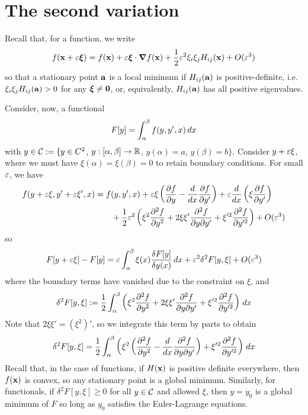 \documentclass{../template/note}
\begin{document}
    \section{The second variation}

    Recall that, for a function, we write
    \begin{align*}
        f(\V x + \eps \V \xi) = f(\V x) + \eps \V \xi \cdot \grad f(\V x) + \frac 1 2 \eps^2 \xi_i \xi_j H_{ij}(\V x) + O(\eps^3)
    \end{align*}
    so that a stationary point $\V a$ is a local minimum if $H_{ij}(\V a)$ is positive-definite, i.e. $\xi_i \xi_j H_{ij}(\V a) > 0$ for any $\V \xi \neq \V 0$, or, equivalently, $H_{ij}(\V a)$ has all positive eigenvalues.

    Consider, now, a functional
    \begin{align*}
        F[y] = \int_{\alpha}^{\beta} f(y, y', x) \,d{x}
    \end{align*}
    with $y \in \mathcal{C} := \{y \in C^2$, $y: [\alpha, \beta] \to \mathbb R$, $y(\alpha) = a$, $y(\beta) = b\}$. Consider $y + \varepsilon \xi$, where we must have $\xi(\alpha) = \xi(\beta) = 0$ to retain boundary conditions. For small $\varepsilon$, we have
    \begin{align*}
        f(y + \eps \xi, y' + \eps \xi', x) &= f(y, y', x) + \eps \xi\left(\pd{f}{y} - \frac{d}{dx} \pd{f}{y'}\right) + \eps \frac{d}{dx}\left(\xi \pd{f}{y'}\right) \\
        &\qquad + \frac 1 2 \eps^2 \left(\xi^2 \pd{^2f}{y^2} + 2\xi \xi' \pd{^2f}{y\pr y'} + \xi'^2 \pd{^2f}{y'^2}\right) + O(\eps^3)
    \end{align*}
    so
    \begin{align*}
        F[y+\varepsilon \xi] - F[y] = \varepsilon \int_\alpha^\beta \xi(x) \frac{\delta F[y]}{\delta y(x)} \,d{x} + \varepsilon^2 \delta^2F[y, \xi] + O(\varepsilon^3)
    \end{align*}
    where the boundary terms have vanished due to the constraint on $\xi$, and
    \begin{align*}
        \delta^2 F[y, \xi] := \frac 1 2 \int_\alpha^\beta \left(\xi^2 \pd{^2f}{y^2} + 2\xi \xi' \pd{^2f}{y\pr y'} + \xi'^2 \pd{^2f}{y'^2}\right) \D x
    \end{align*}
    Note that $2 \xi \xi' = (\xi^2)'$, so we integrate this term by parts to obtain
    \begin{align*}
        \delta^2 F[y, \xi] = \frac 1 2 \int_\alpha^\beta \left(\xi^2 \left(\pd{^2f}{y^2} - \frac{d}{dx} \pd{^2f}{y \pr y'}\right) + \xi'^2 \pd{^2f}{y'^2}\right) \D x
    \end{align*}
    Recall that, in the case of functions, if $H(\V x)$ is positive definite everywhere, then $f(\V x)$ is convex, so any stationary point is a global minimum. Similarly, for functionals, if $\delta^2 F[y, \xi] \geq 0$ for all $y \in \mathcal{C}$ and allowed $\xi$, then $y = y_0$ is a global minimum of $F$ so long as $y_0$ satisfies the Euler-Lagrange equations.
    
\end{document}
